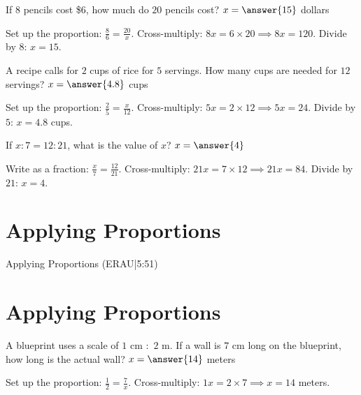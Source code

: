 \documentclass{ximera}
\begin{document}
\begin{problem}
If $8$ pencils cost \$6, how much do $20$ pencils cost? $x=\answer{15}$ dollars
\begin{feedback}
Set up the proportion: $\frac{8}{6} = \frac{20}{x}$. Cross-multiply: $8x = 6 \times 20 \implies 8x = 120$. Divide by $8$: $x = 15$.
\end{feedback}
\end{problem}

\begin{problem}
A recipe calls for $2$ cups of rice for $5$ servings. How many cups are needed for $12$ servings? $x=\answer{4.8}$ cups
\begin{feedback}
Set up the proportion: $\frac{2}{5} = \frac{x}{12}$. Cross-multiply: $5x = 2 \times 12 \implies 5x = 24$. Divide by $5$: $x = 4.8$ cups.
\end{feedback}
\end{problem}

\begin{problem}
If $x:7 = 12:21$, what is the value of $x$? $x=\answer{4}$
\begin{feedback}
Write as a fraction: $\frac{x}{7} = \frac{12}{21}$. Cross-multiply: $21x = 7 \times 12 \implies 21x = 84$. Divide by $21$: $x = 4$.
\end{feedback}
\end{problem}


\section*{Applying Proportions}

Applying Proportions (ERAU|5:51)



\section*{Applying Proportions}

\begin{problem}
A blueprint uses a scale of $1$ cm $:$ $2$ m. If a wall is $7$ cm long on the blueprint, how long is the actual wall? $x=\answer{14}$ meters
\begin{feedback}
Set up the proportion: $\frac{1}{2} = \frac{7}{x}$. Cross-multiply: $1x = 2 \times 7 \implies x = 14$ meters.
\end{feedback}
\end{problem}
\end{document}
